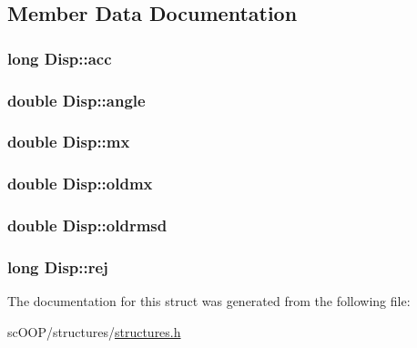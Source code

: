 \subsection{Member Data Documentation}
\hypertarget{struct_disp_a2f55a3f871df675bd8eedbaa706b4c03}{
\subsubsection[{acc}]{\setlength{\rightskip}{0pt plus 5cm}long Disp\+::acc}}\label{struct_disp_a2f55a3f871df675bd8eedbaa706b4c03}
\hypertarget{struct_disp_a40442346e379ba0674a8401502551b3a}{
\subsubsection[{angle}]{\setlength{\rightskip}{0pt plus 5cm}double Disp\+::angle}}\label{struct_disp_a40442346e379ba0674a8401502551b3a}
\hypertarget{struct_disp_a12da7c0801e5ce844e28b7a785b7556c}{
\subsubsection[{mx}]{\setlength{\rightskip}{0pt plus 5cm}double Disp\+::mx}}\label{struct_disp_a12da7c0801e5ce844e28b7a785b7556c}
\hypertarget{struct_disp_a3aa81c561f1dac48d4c486468b960919}{
\subsubsection[{oldmx}]{\setlength{\rightskip}{0pt plus 5cm}double Disp\+::oldmx}}\label{struct_disp_a3aa81c561f1dac48d4c486468b960919}
\hypertarget{struct_disp_ad895f0ec10cdd0f00de4a65667566f5b}{
\subsubsection[{oldrmsd}]{\setlength{\rightskip}{0pt plus 5cm}double Disp\+::oldrmsd}}\label{struct_disp_ad895f0ec10cdd0f00de4a65667566f5b}
\hypertarget{struct_disp_adcb197b8efb6392c5d08e1222cd488ee}{
\subsubsection[{rej}]{\setlength{\rightskip}{0pt plus 5cm}long Disp\+::rej}}\label{struct_disp_adcb197b8efb6392c5d08e1222cd488ee}


The documentation for this struct was generated from the following file\+:\begin{DoxyCompactItemize}
\item 
sc\+O\+O\+P/structures/\hyperlink{structures_8h}{structures.\+h}\end{DoxyCompactItemize}
